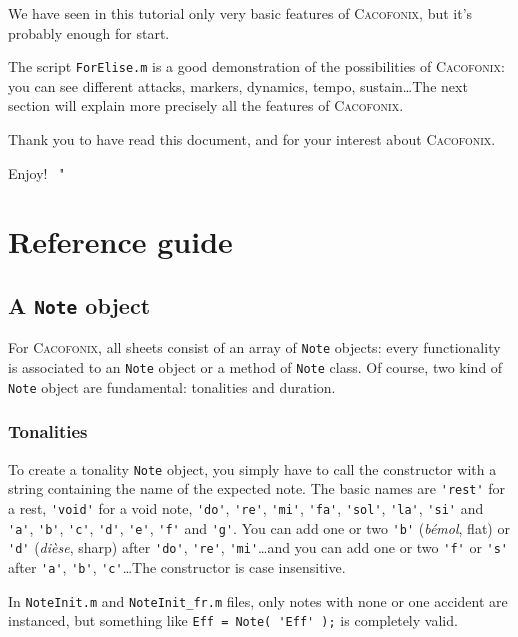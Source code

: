 \documentclass{article}
\newcommand\cacofonix{\textsc{Cacofonix}\xspace}
\newcommand\note{\lstinline!Note!\xspace}
\newcommand\noteInitFile{\texttt{NoteInit.m}\xspace}
\newcommand\noteInitFrFile{\texttt{NoteInit\_fr.m}\xspace}
\newenvironment{myselfenv}{ \par \noindent \makebox[6em][r]{ \textcolor{myselfcolor}{Myself}: " --~}}{~"}
\newcommand{ \myself }[1]{%
\begin{myselfenv}%
	#1%
\end{myselfenv} }
\begin{document}
We have seen in this tutorial only very basic features of \cacofonix, but it's probably enough for start.

The script \texttt{ForElise.m} is a good demonstration of the possibilities of \cacofonix: you can see different attacks, markers, dynamics, tempo, sustain\dots The next section will explain more precisely all the features of \cacofonix.

Thank you to have read this document, and for your interest about \cacofonix.

\myself{ Enjoy! }

\section{Reference guide}

\subsection{A \note object}

For \cacofonix, all sheets consist of an array of \lstinline!Note! objects: every functionality is associated to an \lstinline!Note! object or a method of \lstinline!Note! class. Of course, two kind of \lstinline!Note! object are fundamental: tonalities and duration.

\subsubsection{Tonalities}

To create a tonality \lstinline!Note! object, you simply have to call the constructor with a string containing the name of the expected note. The basic names are \lstinline!'rest'! for a rest, \lstinline!'void'! for a void note, \lstinline!'do'!, \lstinline!'re'!, \lstinline!'mi'!, \lstinline!'fa'!, \lstinline!'sol'!, \lstinline!'la'!, \lstinline!'si'! and \lstinline!'a'!, \lstinline!'b'!, \lstinline!'c'!, \lstinline!'d'!, \lstinline!'e'!, \lstinline!'f'! and \lstinline!'g'!. You can add one or two \lstinline!'b'! (\emph{b\'emol}, flat) or \lstinline!'d'! (\emph{di\`ese}, sharp) after \lstinline!'do'!, \lstinline!'re'!, \lstinline!'mi'!\dots and you can add one or two \lstinline!'f'! or \lstinline!'s'! after \lstinline!'a'!, \lstinline!'b'!, \lstinline!'c'!\dots The constructor is case insensitive.

In \noteInitFile and \noteInitFrFile files, only notes with none or one accident are instanced, but something like \lstinline!Eff = Note( 'Eff' );! is completely valid.
\end{document}
